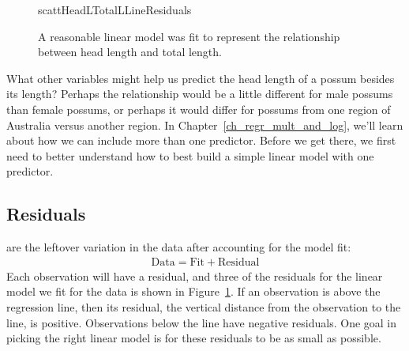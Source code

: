 \begin{figure}
  \centering
      {scattHeadLTotalLLineResiduals}
  \caption{A reasonable linear model was fit to represent
      the relationship between head length and total length.}
  \label{scattHeadLTotalLLine}
\end{figure}

\begin{examplewrap}
\begin{nexample}{What other variables might help us predict the
    head length of a possum besides its length?}
  Perhaps the relationship would be a little different for
  male possums than female possums,
  or perhaps it would differ for possums from one region
  of Australia versus another region.
  In Chapter~\ref{ch_regr_mult_and_log},
  we'll learn about how we can include more than one predictor.
  Before we get there, we first need to better understand
  how to best build a simple linear model with one predictor.
\end{nexample}
\end{examplewrap}


\subsection{Residuals}


\noindent%
 are the leftover variation in the data after accounting for the model fit:
\begin{align*}
\text{Data} = \text{Fit} + \text{Residual}
\end{align*}
Each observation will have a residual, and three of the
residuals for the linear model we fit for the 
data is shown in
Figure~\ref{scattHeadLTotalLLine}.
If an observation is above the regression line, then its residual,
the vertical distance from the observation to the line, is positive.
Observations below the line have negative residuals.
One goal in picking the right linear model is for these residuals
to be as small as possible.


